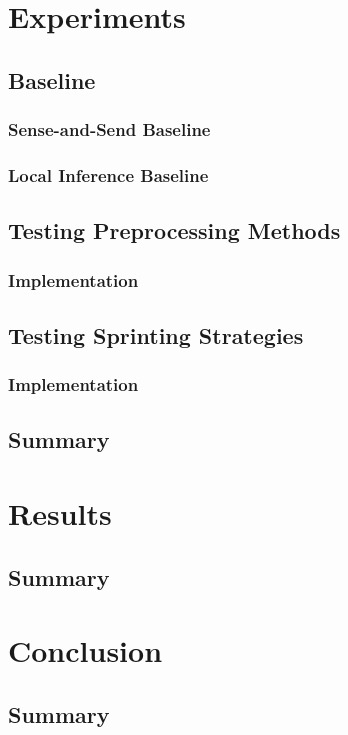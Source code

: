 \documentclass[twoside]{report}
\begin{document}
\chapter{Experiments}
\section{Baseline}
\subsection{Sense-and-Send Baseline}
\subsection{Local Inference Baseline}

\section{Testing Preprocessing Methods}
\subsection{Implementation}

\section{Testing Sprinting Strategies}
\subsection{Implementation}

\section{Summary}

\chapter{Results}
\section{Summary}

\chapter{Conclusion}
\section{Summary}



\end{document}
